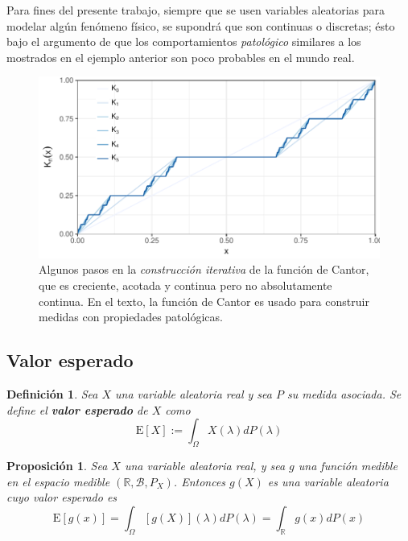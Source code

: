 \documentclass[12pt,letterpaper]{book}
\newtheorem{definicion}{Definición}[chapter]
\newtheorem{proposicion}[teorema]{Proposición}
\newcommand{\R}{\mathbb{R}}
\newcommand{\E}[1]{\mathrm{E}\left[ #1 \right]}
\begin{document}
Para fines del presente trabajo, siempre que se usen variables aleatorias para modelar algún fenómeno físico, se supondrá que son continuas o discretas; ésto bajo el argumento de que los comportamientos \textit{patológico} similares a los mostrados en el ejemplo anterior son poco probables en el mundo real.

\begin{figure}
\includegraphics[width=\linewidth]{./img_mas_ejemplos/cantor.pdf}
\caption[Algunos pasos en la \textit{construcción iterativa} de la función de Cantor]{Algunos pasos en la \textit{construcción iterativa} de la función de Cantor, que es creciente, acotada y continua pero no absolutamente continua. En el texto, la función de Cantor es usado para construir medidas con propiedades patológicas.}
\label{img:cantor}
\end{figure}


\subsection{Valor esperado}

\begin{definicion}
Sea $X$ una variable aleatoria real y sea $P$ su medida asociada. Se define el \textbf{valor esperado} de $X$ como
\begin{equation}
\E{X} := \int_\Omega X(\lambda) dP(\lambda)
\end{equation}
\end{definicion}

\begin{proposicion}
Sea $X$ una variable aleatoria real, y sea $g$ una función medible en el espacio medible $(\R,\mathcal{B},P_X)$. Entonces $g(X)$ es una variable aleatoria cuyo valor esperado es
\begin{equation}
\E{g(x)} = \int_\Omega [g(X)](\lambda) dP(\lambda) = \int_\R g(x) dP(x)
\end{equation}
\end{proposicion}
\end{document}
